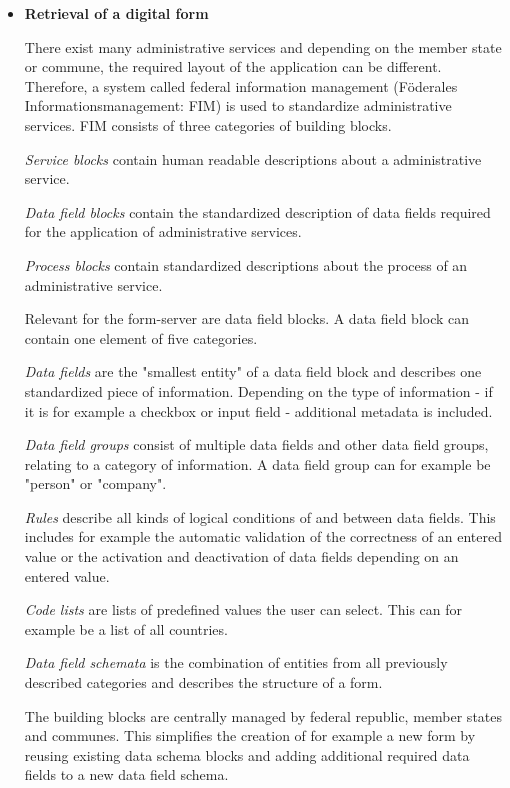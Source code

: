 \begin{itemize}
    \item \textbf{Retrieval of a digital form}
    
    There exist many administrative services and depending on the member state or commune, the required layout of the application can be different. Therefore, a system called federal information management (Föderales Informationsmanagement: FIM) is used to standardize administrative services. FIM consists of three categories of building blocks.
    
    \textit{Service blocks} contain human readable descriptions about a administrative service.
    
    \textit{Data field blocks} contain the standardized description of data fields required for the application of administrative services.
    
    \textit{Process blocks} contain standardized descriptions about the process of an administrative service.

    Relevant for the form-server are data field blocks. A data field block can contain one element of five categories.
    
    \textit{Data fields} are the "smallest entity" of a data field block and describes one standardized piece of information. Depending on the type of information - if it is for example a checkbox or input field - additional metadata is included.
    
    \textit{Data field groups} consist of multiple data fields and other data field groups, relating to a category of information. A data field group can for example be "person" or "company".
    
    \textit{Rules} describe all kinds of logical conditions of and between data fields. This includes for example the automatic validation of the correctness of an entered value or the activation and deactivation of data fields depending on an entered value.
    
    \textit{Code lists} are lists of predefined values the user can select. This can for example be a list of all countries.
    
    \textit{Data field schemata} is the combination of entities from all previously described categories and describes the structure of a form.
    
    The building blocks are centrally managed by federal republic, member states and communes. This simplifies the creation of for example a new form by reusing existing data schema blocks and adding additional required data fields to a new data field schema.
    

\end{itemize}
